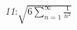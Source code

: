 \documentclass{standalone}
\begin{document}
\emph{11}:$\sqrt{6\sum_{n=1}^{\infty}\frac{1}{n^2}}$
\end{document}
